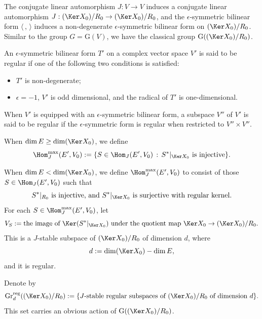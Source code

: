 \documentclass[11pt,a4paper]{amsart}
\def\Im{\operatorname{Im}}
\newcommand{\la}{\langle}
\newcommand{\ra}{\rangle}
\numberwithin{equation}{section}
\theoremstyle{remark}
\begin{document}
The conjugate linear automorphism $J:V\rightarrow V$ induces a conjugate linear automorphism $J:(\Ker X_0)/R_0\rightarrow (\Ker X_0)/R_0$, and the $\epsilon$-symmetric bilinear form $\la\,,\,\ra$ induces a non-degenerate  $\epsilon$-symmetric bilinear form on $(\Ker X_0)/R_0$. Similar to the group $G=\mathrm{G}(V)$, we have the classical group $\mathrm{G}((\Ker X_0)/R_0)$.

An  $\epsilon$-symmetric bilinear form $T'$ on a complex vector space $V'$ is said to be regular if one of the following two conditions is satisfied:   
\begin{itemize}
    \item $T'$ is non-degenerate;
    \item $\epsilon =-1$, $V'$ is odd dimensional, and the radical of $T'$ is one-dimensional.  
\end{itemize}
 When $V'$ is equipped with an $\epsilon$-symmetric bilinear form, a subspace $V''$ of $V'$ is said to be regular if the $\epsilon$-symmetric form is regular when restricted to $V''\times V''$.


When $\dim E \geq \dim (\Ker X_0)$, we define   
 \[
 \Hom_J^{\max}(E',V_0):=\{S\in \Hom_J(E',V_0)  \,:\,  S^*|_{\Ker X_0} \text{ is injective}\}. 
\]

When $\dim E < \dim (\Ker X_0)$, we define $\Hom_J^{\max}(E',V_0)$ to consist of those $S\in \Hom_J(E',V_0)$ such that 
\[
\textrm{$S^*|_{R_0}$ is injective, and $S^*|_{\Ker X_0}$ is surjective with regular kernel}.
\]
For each $S\in \Hom_J^{\max}(E',V_0)$, let  
\[
V_S := \textrm{the image of $\Ker (S^*|_{\Ker X_0})$ under the quotient map $\Ker X_0\rightarrow  (\Ker X_0)/R_0$}.
\]
 This is a $J$-stable subspace of $(\Ker X_0)/R_0$ of dimension $d$, where 
\[
d:=\dim (\Ker X_0) -\dim E, 
\]
and it is regular.

Denote by 
 \[
\mathrm{Gr}_{d}^{\mathrm{reg}} ((\Ker X_0)/R_0):=\{\textrm{$J$-stable regular subspaces of $(\Ker X_0)/R_0$ of dimension $d$}\}.
\]
This set carries an obvious action of $\mathrm{G}((\Ker X_0)/R_0)$.
\end{document}
